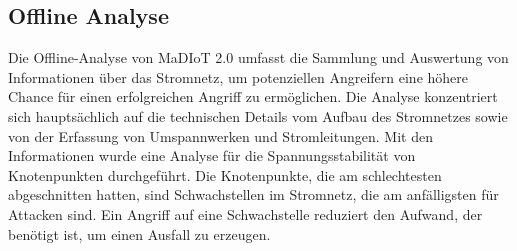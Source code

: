 \documentclass[
    a4paper,
    pagesize,
	pdftex,
    12pt,
]{scrartcl}
\begin{document}
\begin{multicols}{2}
\subsection{Offline Analyse}
Die Offline-Analyse von MaDIoT 2.0 umfasst die Sammlung und Auswertung von Informationen über das Stromnetz, um potenziellen Angreifern eine höhere Chance für einen erfolgreichen Angriff zu ermöglichen. Die Analyse konzentriert sich hauptsächlich auf die technischen Details vom Aufbau des Stromnetzes sowie von der Erfassung von Umspannwerken und Stromleitungen. Mit den Informationen wurde eine Analyse für die Spannungsstabilität von Knotenpunkten durchgeführt. Die Knotenpunkte, die am schlechtesten abgeschnitten hatten, sind Schwachstellen im Stromnetz, die am anfälligsten für Attacken sind. Ein Angriff auf eine Schwachstelle reduziert den Aufwand, der benötigt ist, um einen Ausfall zu erzeugen.

\end{multicols}
\end{document}

